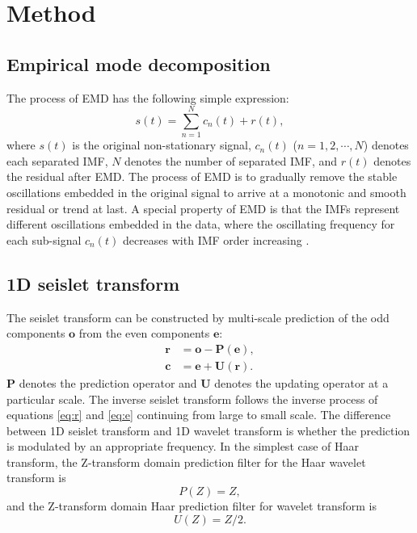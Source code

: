 \section{Method}
\subsection{Empirical mode decomposition}
The process of EMD has the following simple expression: 
\begin{equation}
\label{eq:emd}
s(t)=\sum_{n=1}^{N}c_n(t)+r(t),
\end{equation}
where $s(t)$ is the original non-stationary signal, $c_n(t)$ ($n=1,2,\cdots,N$) denotes each separated IMF, $N$ denotes the number of separated IMF, and $r(t)$ denotes the residual after EMD. The process of EMD is to gradually remove the stable oscillations embedded in the original signal to arrive at a monotonic and smooth residual or trend at last. A special property of  EMD is that the IMFs represent different oscillations embedded in the data, where the oscillating frequency for each sub-signal $c_n(t)$ decreases with IMF order increasing \cite[]{huangemd}. 

\subsection{1D seislet transform}
The seislet transform can be constructed by multi-scale prediction of the odd components $\mathbf{o}$ from the even components $\mathbf{e}$:
\begin{align}
\label{eq:r}
\mathbf{r}&=\mathbf{o}-\mathbf{P}(\mathbf{e}), \\
\label{eq:e}
\mathbf{c}&=\mathbf{e}+\mathbf{U}(\mathbf{r}).
\end{align}
 $\mathbf{P}$ denotes the prediction operator and $\mathbf{U}$ denotes the updating operator at a particular scale.  The inverse seislet transform follows the inverse process of equations \ref{eq:r} and \ref{eq:e} continuing from large to small scale. The difference between  1D seislet transform and  1D wavelet transform is whether the prediction is modulated by an appropriate frequency. In the simplest case of Haar transform, the Z-transform domain prediction filter for the Haar wavelet transform is 
\begin{equation}
\label{eq:haar}
P(Z)=Z,
\end{equation}
and the Z-transform domain Haar prediction filter for wavelet transform is 
\begin{equation}
\label{eq:haaru}
U(Z)=Z/2.
\end{equation}

